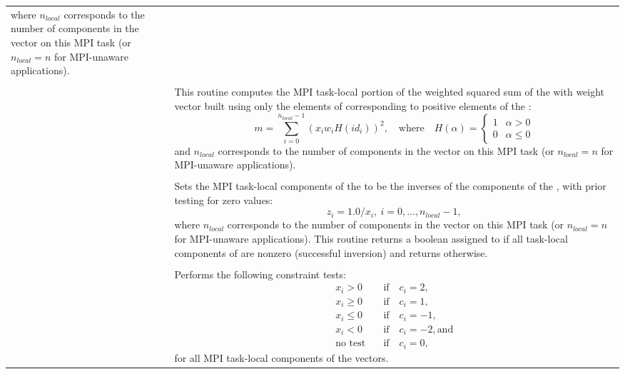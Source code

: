 \begin{xtabular}{|p{\coloned}|p{\coltwod}|}
where $n_{local}$ corresponds
to the number of components in the vector on this MPI task (or
$n_{local}=n$ for MPI-unaware applications).
\\[2mm]
 &  \\
& This routine computes the MPI task-local portion of the weighted
squared sum of the   with weight
vector  built using only the elements of  corresponding to
positive elements of the  :
\begin{equation*}
m = \sum_{i=0}^{n_{local}-1} (x_i w_i H(id_i))^2, \quad \text{where} \quad H(\alpha)
= \begin{cases} 1 & \alpha > 0 \\ 0 & \alpha \leq 0 \end{cases}
\end{equation*}
and
$n_{local}$ corresponds to the number of components in the vector on
this MPI task (or $n_{local}=n$ for MPI-unaware applications).
\\[2mm]
 &  \\
& Sets the MPI task-local components of the   to
be the inverses of the components of the  , with
prior testing for zero values:
\begin{equation*}
z_i = 1.0 /  x_i  , \: i=0,\ldots,n_{local}-1,
\end{equation*}
where $n_{local}$
corresponds to the number of components in the vector on this MPI task
(or $n_{local}=n$ for MPI-unaware applications).  This routine returns
a boolean assigned to  if all task-local components of
 are nonzero (successful inversion) and returns 
otherwise.
\\[2mm]
 &  \\
& Performs the following constraint tests:
{\begin{align*}
x_i > 0        & \quad \text{if} \quad c_i=2, \\
x_i \ge 0      & \quad \text{if} \quad c_i=1, \\
x_i \le 0      & \quad \text{if} \quad c_i=-1, \\
x_i < 0        & \quad \text{if} \quad c_i=-2, \text{and} \\
\text{no test} & \quad \text{if} \quad c_i=0,
\end{align*}}%
for all MPI task-local components of the vectors.

\end{xtabular}
